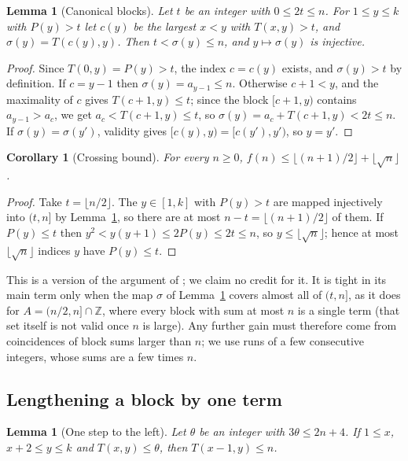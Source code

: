 \documentclass[11pt]{amsart}
\newtheorem{lemma}[theorem]{Lemma}
\newtheorem{corollary}[theorem]{Corollary}
\theoremstyle{remark}
\newcommand{\Z}{\mathbb{Z}}
\newcommand{\isqrt}[1]{\lfloor\sqrt{#1}\rfloor}
\begin{document}
\begin{lemma}[Canonical blocks]\label{lem:canon}
Let $t$ be an integer with $0\le 2t\le n$. For $1\le y\le k$ with $P(y)>t$ let $c(y)$ be the largest $x<y$ with $T(x,y)>t$, and
$\sigma(y)=T(c(y),y)$. Then $t<\sigma(y)\le n$, and $y\mapsto\sigma(y)$ is injective.
\end{lemma}

\begin{proof}
Since $T(0,y)=P(y)>t$, the index $c=c(y)$ exists, and $\sigma(y)>t$ by definition. If $c=y-1$ then $\sigma(y)=a_{y-1}\le n$. Otherwise
$c+1<y$, and the maximality of $c$ gives $T(c+1,y)\le t$; since the block $[c+1,y)$ contains $a_{y-1}>a_c$, we get $a_c<T(c+1,y)\le t$,
so $\sigma(y)=a_c+T(c+1,y)<2t\le n$. If $\sigma(y)=\sigma(y')$, validity gives $[c(y),y)=[c(y'),y')$, so $y=y'$.
\end{proof}

\begin{corollary}[Crossing bound]\label{cor:crossing}
For every $n\ge0$, $f(n)\le\lfloor(n+1)/2\rfloor+\isqrt n$.
\end{corollary}

\begin{proof}
Take $t=\lfloor n/2\rfloor$. The $y\in[1,k]$ with $P(y)>t$ are mapped injectively into $(t,n]$ by Lemma~\ref{lem:canon}, so there are at
most $n-t=\lfloor(n+1)/2\rfloor$ of them. If $P(y)\le t$ then $y^2<y(y+1)\le 2P(y)\le 2t\le n$, so $y\le\isqrt n$; hence at most $\isqrt n$
indices $y$ have $P(y)\le t$.
\end{proof}

This is a version of the argument of \cite{EPDay2026}; we claim no credit for it. It is tight in its main term only when the map $\sigma$ of
Lemma~\ref{lem:canon} covers almost all of $(t,n]$, as it does for $A=(n/2,n]\cap\Z$, where every block with sum at most $n$ is a single
term (that set itself is not valid once $n$ is large). Any further gain must therefore come from coincidences of block sums larger than
$n$; we use runs of a few consecutive integers, whose sums are a few times $n$.

\subsection{Lengthening a block by one term}

\begin{lemma}[One step to the left]\label{lem:chain}
Let $\theta$ be an integer with $3\theta\le 2n+4$. If $1\le x$, $x+2\le y\le k$ and $T(x,y)\le\theta$, then $T(x-1,y)\le n$.
\end{lemma}
\end{document}
